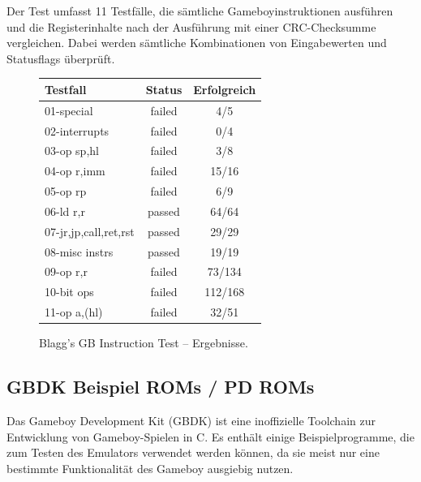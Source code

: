 \documentclass[a4paper]{scrartcl}
\begin{document}
Der Test umfasst 11 Testfälle, die sämtliche Gameboyinstruktionen ausführen und die Registerinhalte nach der Ausführung mit einer CRC-Checksumme vergleichen. Dabei werden sämtliche Kombinationen von Eingabewerten und Statusflags überprüft.

\begin{figure}[H]
\centering
\begin{tabular}{l|c|c}
Testfall&Status&Erfolgreich \\
\hline
01-special&failed&4/5 \\
02-interrupts&failed&0/4 \\
03-op sp,hl&failed&3/8 \\
04-op r,imm&failed&15/16 \\
05-op rp&failed&6/9 \\
06-ld r,r&passed&64/64 \\
07-jr,jp,call,ret,rst&passed&29/29 \\
08-misc instrs&passed&19/19 \\
09-op r,r&failed&73/134 \\
10-bit ops&failed&112/168 \\
11-op a,(hl)&failed&32/51
\end{tabular}
\caption{Blagg's GB Instruction Test -- Ergebnisse.}
\label{tab:inst_test}
\end{figure}

\pagebreak
\subsection{GBDK Beispiel ROMs / PD ROMs}

Das Gameboy Development Kit (GBDK) ist eine inoffizielle Toolchain zur Entwicklung von Gameboy-Spielen in C. Es enthält einige Beispielprogramme, die zum Testen des Emulators verwendet werden können, da sie meist nur eine bestimmte Funktionalität des Gameboy ausgiebig nutzen.
\end{document}

